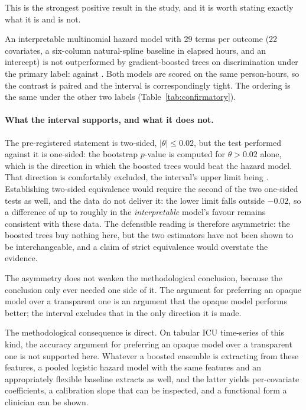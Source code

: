 This is the strongest positive result in the study, and it is worth stating
exactly what it is and is not.

An interpretable multinomial hazard model with 29 terms per outcome
(22 covariates, a six-column natural-spline baseline in elapsed hours, and an
intercept) is not outperformed by gradient-boosted
trees on discrimination under the primary label: \pcAurocPrimaryB{} against
\pcAurocGbtB. Both models are scored on the same person-hours, so the contrast
is paired and the interval is correspondingly tight. The ordering is the same
under the other two labels (Table~\ref{tab:confirmatory}).

\paragraph{What the interval supports, and what it does not.} The pre-registered
statement is two-sided, $|\theta| \leq 0.02$, but the test performed against it
is one-sided: the bootstrap $p$-value is computed for $\theta > 0.02$ alone,
which is the direction in which the boosted trees would beat the hazard model.
That direction is comfortably excluded, the interval's upper limit being
\pcHSixCiHi. Establishing two-sided equivalence would require the second of the
two one-sided tests as well, and the data do not deliver it: the lower limit
\pcHSixCiLo{} falls outside $-0.02$, so a difference of up to roughly
\pcHSixCiLo{} in the \emph{interpretable} model's favour remains consistent with
these data. The defensible reading is therefore asymmetric: the boosted trees
buy nothing here, but the two estimators have not been shown to be
interchangeable, and a claim of strict equivalence would overstate the evidence.

The asymmetry does not weaken the methodological conclusion, because the
conclusion only ever needed one side of it. The argument for preferring an
opaque model over a transparent one is an argument that the opaque model
performs better; the interval excludes that in the only direction it is made.

The methodological consequence is direct. On tabular ICU time-series of this
kind, the accuracy argument for preferring an opaque model over a transparent
one is not supported here. Whatever a boosted ensemble is extracting from these
features, a pooled logistic hazard model with the same features and an
appropriately flexible baseline extracts as well, and the latter yields
per-covariate coefficients, a calibration slope that can be inspected, and a
functional form a clinician can be shown.

